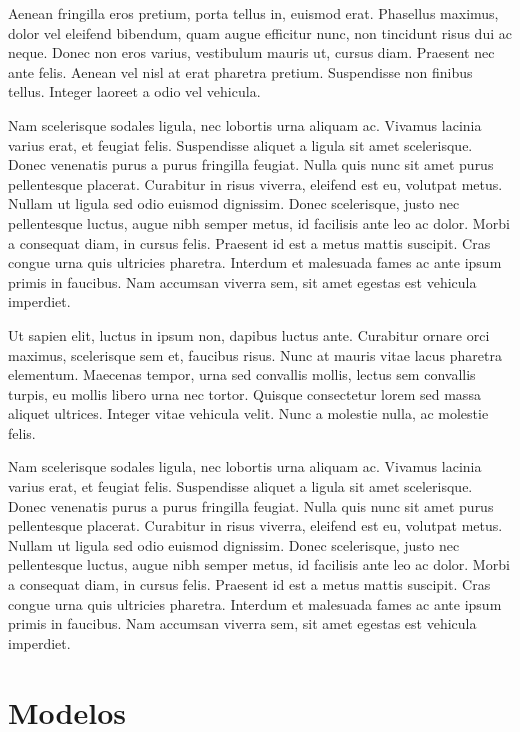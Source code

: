 \begin{btUnit}
Aenean fringilla eros pretium, porta tellus in, euismod erat.
Phasellus maximus, dolor vel eleifend bibendum, quam augue efficitur
nunc, non tincidunt risus dui ac neque. Donec non eros varius,
vestibulum mauris ut, cursus diam. Praesent nec ante felis. Aenean vel
nisl at erat pharetra pretium. Suspendisse non finibus tellus. Integer
laoreet a odio vel vehicula.

Nam scelerisque sodales ligula, nec lobortis urna aliquam ac. Vivamus
lacinia varius erat, et feugiat felis. Suspendisse aliquet a ligula
sit amet scelerisque. Donec venenatis purus a purus fringilla feugiat.
Nulla quis nunc sit amet purus pellentesque placerat. Curabitur in
risus viverra, eleifend est eu, volutpat metus. Nullam ut ligula sed
odio euismod dignissim. Donec scelerisque, justo nec pellentesque
luctus, augue nibh semper metus, id facilisis ante leo ac dolor. Morbi
a consequat diam, in cursus felis. Praesent id est a metus mattis
suscipit. Cras congue urna quis ultricies pharetra. Interdum et
malesuada fames ac ante ipsum primis in faucibus. Nam accumsan viverra
sem, sit amet egestas est vehicula imperdiet.

Ut sapien elit, luctus in ipsum non, dapibus luctus ante. Curabitur
ornare orci maximus, scelerisque sem et, faucibus risus. Nunc at
mauris vitae lacus pharetra elementum. Maecenas tempor, urna sed
convallis mollis, lectus sem convallis turpis, eu mollis libero urna
nec tortor. Quisque consectetur lorem sed massa aliquet ultrices.
Integer vitae vehicula velit. Nunc a molestie nulla, ac molestie
felis.

Nam scelerisque sodales ligula, nec lobortis urna aliquam ac. Vivamus
lacinia varius erat, et feugiat felis. Suspendisse aliquet a ligula
sit amet scelerisque. Donec venenatis purus a purus fringilla feugiat.
Nulla quis nunc sit amet purus pellentesque placerat. Curabitur in
risus viverra, eleifend est eu, volutpat metus. Nullam ut ligula sed
odio euismod dignissim. Donec scelerisque, justo nec pellentesque
luctus, augue nibh semper metus, id facilisis ante leo ac dolor. Morbi
a consequat diam, in cursus felis. Praesent id est a metus mattis
suscipit. Cras congue urna quis ultricies pharetra. Interdum et
malesuada fames ac ante ipsum primis in faucibus. Nam accumsan viverra
sem, sit amet egestas est vehicula imperdiet.

\section{Modelos}


\end{btUnit}
